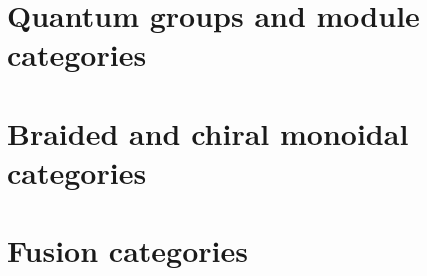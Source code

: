         \minitoc
        
        
        
        
        
        
        
        
    
    \chapter{Quantum groups and module categories}
        \begin{abstract}
            
        \end{abstract}
        
        \minitoc
        
        
        
        
    
    \chapter{Braided and chiral monoidal categories}
        \begin{abstract}
            
        \end{abstract}
        
        \minitoc
        
        
        
        
    
    \chapter{Fusion categories}
        \begin{abstract}
            
        \end{abstract}
        
        \minitoc
        
        
        
